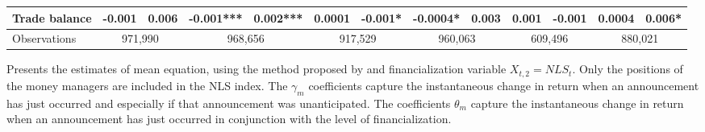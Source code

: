 \begin{landscape}
\begin{table}[]
{\begin{tabular}{lllllllllllll}
Trade balance            & -0.001    & 0.006     & -0.001***  & 0.002*** & 0.0001    & -0.001*   & -0.0004*  & 0.003    & 0.001     & -0.001    & 0.0004     & 0.006*    \\ \hline
Observations &
  \multicolumn{2}{c}{971,990} &
  \multicolumn{2}{c}{968,656} &
  \multicolumn{2}{c}{917,529} &
  \multicolumn{2}{c}{960,063} &
  \multicolumn{2}{c}{609,496} &
  \multicolumn{2}{c}{880,021} \\ \hline
\end{tabular}%
}
\singlespacing
        \footnotesize
      Presents the estimates of mean equation, using the method proposed by \citep{andersen2007real} and financialization variable $X_{t,2}=NLS_t$. Only the positions of the money managers are included in the NLS index. The $\gamma_m$ coefficients capture the instantaneous change in return when an announcement has just occurred and especially if that announcement was unanticipated. The coefficients $\theta_m$ capture the instantaneous change in return when an announcement has just occurred in conjunction with the level of financialization.
\end{table}
\end{landscape}

